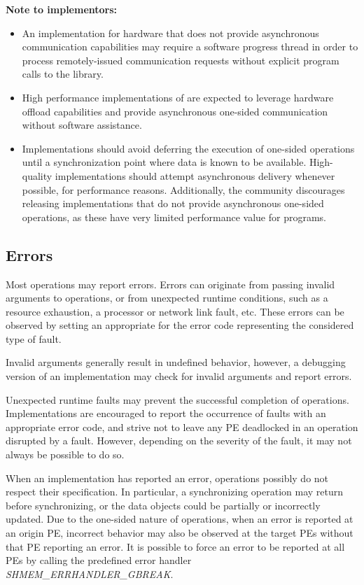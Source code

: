 \textbf{Note to implementors:}
\begin{itemize}
  \item An \openshmem implementation for hardware that does not provide
      asynchronous communication capabilities may require a software progress
      thread in order to process remotely-issued communication requests without
      explicit program calls to the \openshmem library.
  \item High performance implementations of \openshmem are expected to leverage
      hardware offload capabilities and provide asynchronous one-sided
      communication without software assistance.
  \item Implementations should avoid deferring the execution of one-sided
      operations until a synchronization point where data is known to be
      available. High-quality implementations should attempt asynchronous delivery
      whenever possible, for performance reasons. Additionally, the \openshmem
      community discourages releasing \openshmem implementations that do not
      provide asynchronous one-sided operations, as these have very limited
      performance value for \openshmem programs.
\end{itemize}

\subsection{Errors}\label{sec:errors}

Most \openshmem operations may report errors. Errors can originate from
passing invalid arguments to \openshmem operations, or from
unexpected runtime conditions, such as a resource exhaustion, a processor
or network link fault, etc. These errors can be observed by setting an
appropriate  for the error code representing the
considered type of fault.

Invalid arguments generally result in undefined behavior, however, a
debugging version of an \openshmem implementation may check for invalid
arguments and report errors.

Unexpected runtime faults may prevent the successful completion of \openshmem
operations. Implementations are encouraged to report the occurrence of faults
with an appropriate error code, and strive not to leave any \ac{PE} deadlocked
in an operation disrupted by a fault. However, depending on the severity of
the fault, it may not always be possible to do so.

When an \openshmem implementation has reported an error, operations possibly do
not respect their specification. In particular, a synchronizing operation may
return before synchronizing, or the data objects could be partially
or incorrectly updated. Due to the one-sided
nature of \openshmem operations, when an error is reported at
an origin \ac{PE}, incorrect behavior may also be observed at
the target \acp{PE} without that \ac{PE} reporting an error. It is possible
to force an error to be reported at all \acp{PE} by calling the predefined
error handler \textit{SHMEM\_ERRHANDLER\_GBREAK}.


